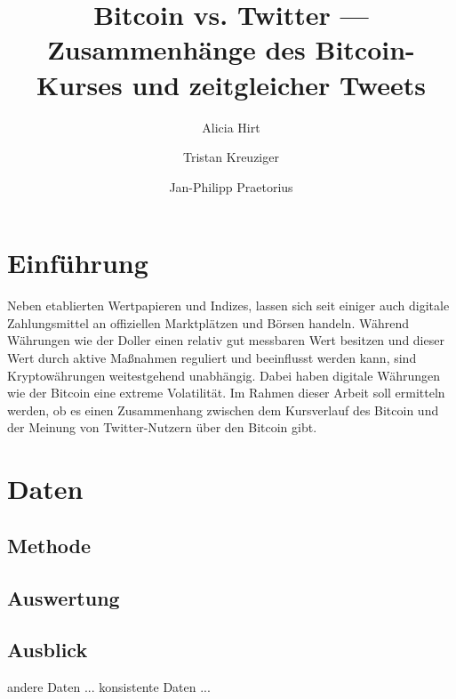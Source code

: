 \documentclass[
journal=jacsat, %
manuscript=article]{achemso}
\author{Alicia Hirt}
\author{Tristan Kreuziger}
\author{Jan-Philipp Praetorius}
\affiliation[Friedrich-Schiller-Universität Jena]
{Faculty of Mathematics and Computer Science, Friedrich-Schiller-Universität Jena, Germany}
\title[Bitcoin vs. Twitter]
{Bitcoin vs. Twitter --- Zusammenh\"ange des Bitcoin-Kurses und zeitgleicher Tweets}
\begin{document}
\section{Einf\"uhrung}

Neben etablierten Wertpapieren und Indizes, lassen sich seit einiger auch digitale Zahlungsmittel an offiziellen Marktpl\"atzen und B\"orsen handeln. W\"ahrend W\"ahrungen wie der Doller einen relativ gut messbaren Wert besitzen und dieser Wert durch aktive Ma{\ss}nahmen reguliert und beeinflusst werden kann, sind Kryptow\"ahrungen weitestgehend unabh\"angig. Dabei haben digitale W\"ahrungen wie der Bitcoin eine extreme Volatilit\"at. Im Rahmen dieser Arbeit soll ermitteln werden, ob es einen Zusammenhang zwischen dem Kursverlauf des Bitcoin und der Meinung von Twitter-Nutzern \"uber den Bitcoin gibt.

\newpage

\section{Daten}


\subsection{Methode}


\subsection{Auswertung}


\subsection{Ausblick}

andere Daten ...
konsistente Daten ...
\end{document}
